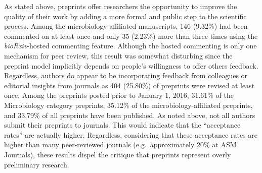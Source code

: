 \documentclass[11pt,]{article}
\begin{document}
As stated above, preprints offer researchers the opportunity to improve
the quality of their work by adding a more formal and public step to the
scientific process. Among the microbiology-affiliated manuscripts, 146
(9.32\%) had been commented on at least once and only 35 (2.23\%) more
than three times using the \emph{bioRxiv}-hosted commenting feature.
Although the hosted commenting is only one mechanism for peer review,
this result was somewhat disturbing since the preprint model implicitly
depends on people's willingness to offer others feedback. Regardless,
authors do appear to be incorporating feedback from colleagues or
editorial insights from journals as 404 (25.80\%) of preprints were
revised at least once. Among the preprints posted prior to January 1,
2016, 31.61\% of the Microbiology category preprints, 35.12\% of the
microbiology-affiliated preprints, and 33.79\% of all preprints have
been published. As noted above, not all authors submit their preprints
to journals. This would indicate that the ``acceptance rates'' are
actually higher. Regardless, considering that these acceptance rates are
higher than many peer-reviewed journals (e.g.~approximately 20\% at ASM
Journals), these results dispel the critique that preprints represent
overly preliminary research.
\end{document}

